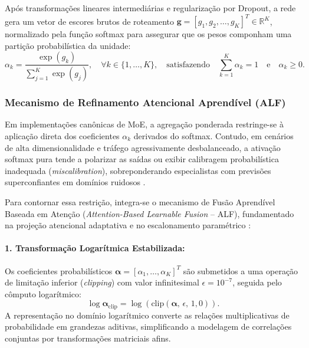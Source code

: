 Após transformações lineares intermediárias e regularização por Dropout, a rede gera um vetor de escores brutos de roteamento $\mathbf{g} = [g_1, g_2, \dots, g_K]^T \in \mathbb{R}^K$, normalizado pela função softmax para assegurar que os pesos componham uma partição probabilística da unidade:
\begin{equation}
\label{eq:gating_softmax}
\alpha_k = \frac{\exp(g_k)}{\sum_{j=1}^K \exp(g_j)}, \quad \forall k \in \{1, \dots, K\}, \quad \text{satisfazendo} \quad \sum_{k=1}^K \alpha_k = 1 \quad \text{e} \quad \alpha_k \ge 0.
\end{equation}

\subsubsection{Mecanismo de Refinamento Atencional Aprendível (ALF)}

Em implementações canônicas de MoE, a agregação ponderada restringe-se à aplicação direta dos coeficientes $\alpha_k$ derivados do softmax. Contudo, em cenários de alta dimensionalidade e tráfego agressivamente desbalanceado, a ativação softmax pura tende a polarizar as saídas ou exibir calibragem probabilística inadequada (\emph{miscalibration}), sobreponderando especialistas com previsões superconfiantes em domínios ruidosos \cite{alfmoe2026}.

Para contornar essa restrição, integra-se o mecanismo de Fusão Aprendível Baseada em Atenção (\emph{Attention-Based Learnable Fusion} -- ALF), fundamentado na projeção atencional adaptativa e no escalonamento paramétrico \cite{alfmoe2026}:

\paragraph{1. Transformação Logarítmica Estabilizada:}
Os coeficientes probabilísticos $\boldsymbol{\alpha} = [\alpha_1, \dots, \alpha_K]^T$ são submetidos a uma operação de limitação inferior (\emph{clipping}) com valor infinitesimal $\epsilon = 10^{-7}$, seguida pelo cômputo logarítmico:
\begin{equation}
\label{eq:log_alpha}
\log \boldsymbol{\alpha}_{\mathrm{clip}} = \log \left( \mathrm{clip}(\boldsymbol{\alpha}, \, \epsilon, \, 1{,}0) \right).
\end{equation}
A representação no domínio logarítmico converte as relações multiplicativas de probabilidade em grandezas aditivas, simplificando a modelagem de correlações conjuntas por transformações matriciais afins.

